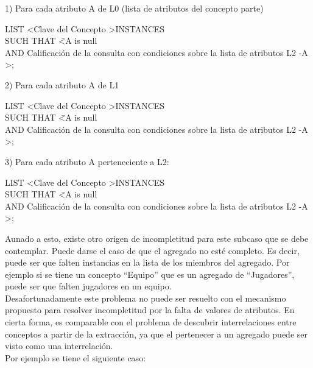 1) Para cada atributo A de L0 (lista de atributos del concepto parte) 

\begin{tabbing}	
LIST \textless Clave del Concepto \textgreater INSTANCES \\
SUCH THAT  \= \textless A is null \\
\> AND Calificación de la consulta con condiciones sobre la lista de atributos L2 -A \textgreater; \\
\end{tabbing}

2) Para cada atributo A de L1 

\begin{tabbing}	
LIST \textless Clave del Concepto \textgreater INSTANCES \\
SUCH THAT  \= \textless A is null \\
\> AND Calificación de la consulta con condiciones sobre la lista de atributos L2 -A \textgreater; \\
\end{tabbing}

3) Para cada atributo A perteneciente a L2: 

\begin{tabbing}	
LIST \textless Clave del Concepto \textgreater INSTANCES \\
SUCH THAT  \= \textless A is null \\
\> AND Calificación de la consulta con condiciones sobre la lista de atributos L2 -A \textgreater; \\
\end{tabbing}

Aunado a esto, existe otro origen de incompletitud para este subcaso que se debe contemplar. Puede darse el caso de que el agregado no esté completo. Es decir, puede ser que falten instancias en la lista de los miembros del agregado. Por ejemplo si se tiene un concepto “Equipo” que es un agregado de “Jugadores”, puede ser que falten jugadores en un equipo.\\

Desafortunadamente este problema no puede ser resuelto con el mecanismo propuesto para resolver incompletitud por la falta de valores de atributos. En cierta forma, es comparable con el problema de descubrir interrelaciones entre conceptos a partir de la extracción, ya que el pertenecer a un agregado puede ser visto como una interrelación.\\
	
Por ejemplo se tiene el siguiente caso: 

